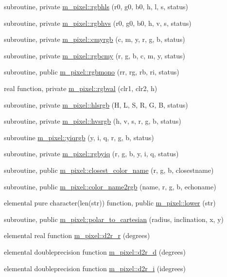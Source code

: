 \begin{DoxyCompactItemize}
subroutine, private \mbox{\hyperlink{namespacem__pixel_a02bb73b68aeae5056ccf76868146b1b4}{m\+\_\+pixel\+::rgbhls}} (r0, g0, b0, h, l, s, status)
\item 
subroutine, private \mbox{\hyperlink{namespacem__pixel_a07ffb197bdcd075f5375e95b43c18915}{m\+\_\+pixel\+::rgbhvs}} (r0, g0, b0, h, v, s, status)
\item 
subroutine, private \mbox{\hyperlink{namespacem__pixel_a98c49513d301803bb2c5cd28b8ccdba3}{m\+\_\+pixel\+::cmyrgb}} (c, m, y, r, g, b, status)
\item 
subroutine, private \mbox{\hyperlink{namespacem__pixel_a4dd5383ae0616511d16c996903a971dc}{m\+\_\+pixel\+::rgbcmy}} (r, g, b, c, m, y, status)
\item 
subroutine, public \mbox{\hyperlink{namespacem__pixel_a63a581cda811571c9ded805516f9d709}{m\+\_\+pixel\+::rgbmono}} (rr, rg, rb, ri, status)
\item 
real function, private \mbox{\hyperlink{namespacem__pixel_a9f8175d7b5b349cd5c30a99100eef5c5}{m\+\_\+pixel\+::rgbval}} (clr1, clr2, h)
\item 
subroutine, private \mbox{\hyperlink{namespacem__pixel_a854b4980c2694d7c33b2830a225eeca0}{m\+\_\+pixel\+::hlsrgb}} (H, L, S, R, G, B, status)
\item 
subroutine, private \mbox{\hyperlink{namespacem__pixel_a6eda5641d5c42b51d9488bd7ea743744}{m\+\_\+pixel\+::hvsrgb}} (h, v, s, r, g, b, status)
\item 
subroutine \mbox{\hyperlink{namespacem__pixel_a0f4f12a4a769b8827a79b44f333eca28}{m\+\_\+pixel\+::yiqrgb}} (y, i, q, r, g, b, status)
\item 
subroutine, private \mbox{\hyperlink{namespacem__pixel_a0c025b24458dba5fb448f62cb10c7088}{m\+\_\+pixel\+::rgbyiq}} (r, g, b, y, i, q, status)
\item 
subroutine, public \mbox{\hyperlink{namespacem__pixel_a8555eecec7e18106e8167e137cfe8424}{m\+\_\+pixel\+::closest\+\_\+color\+\_\+name}} (r, g, b, closestname)
\item 
subroutine, public \mbox{\hyperlink{namespacem__pixel_aee26ac45961d4093d2e472fcb6e1887d}{m\+\_\+pixel\+::color\+\_\+name2rgb}} (name, r, g, b, echoname)
\item 
elemental pure character(len(str)) function, public \mbox{\hyperlink{namespacem__pixel_a7b4934756a8325a19fee6653c4cbf6af}{m\+\_\+pixel\+::lower}} (str)
\item 
subroutine, public \mbox{\hyperlink{namespacem__pixel_a5ee5c618d117b150b661e15517a3d408}{m\+\_\+pixel\+::polar\+\_\+to\+\_\+cartesian}} (radius, inclination, x, y)
\item 
elemental real function \mbox{\hyperlink{namespacem__pixel_af1963e62c5cc06bfb042831d1c869dc1}{m\+\_\+pixel\+::d2r\+\_\+r}} (degrees)
\item 
elemental doubleprecision function \mbox{\hyperlink{namespacem__pixel_a2ea42e55432274dec04fdc822e484cdb}{m\+\_\+pixel\+::d2r\+\_\+d}} (degrees)
\item 
elemental doubleprecision function \mbox{\hyperlink{namespacem__pixel_a0ac7088105ca5334d0ca3f1e4ea16d65}{m\+\_\+pixel\+::d2r\+\_\+i}} (idegrees)
\end{DoxyCompactItemize}
